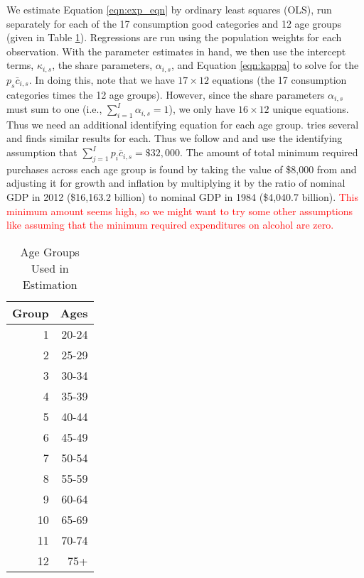 \documentclass[article,11pt,letterpaper,fleqn]{article}
\theoremstyle{definition}
\numberwithin{equation}{section}
\newcommand{\cn}{\citeasnoun} %
\begin{document}
\noindent\noindent  We estimate Equation \ref{eqn:exp_eqn} by ordinary least squares (OLS), run separately for each of the 17 consumption good categories and 12 age groups (given in Table \ref{tab:ages}).  Regressions are run using the population weights for each observation.  With the parameter estimates in hand, we then use the intercept terms, $\kappa_{i,s}$, the share parameters, $\alpha_{i,s}$, and Equation \ref{eqn:kappa} to solve for the $p_{s}\bar{c}_{i,s}$.  In doing this, note that we have $17\times 12$ equations (the 17 consumption categories times the 12 age groups).  However, since the share parameters $\alpha_{i,s}$ must sum to one (i.e., $\sum_{i=1}^{I}\alpha_{i,s}=1$), we only have $16\times 12$ unique equations.  Thus we need an additional identifying equation for each age group.  \cn{King1979} tries several and finds similar results for each. Thus we follow \cn{King1979} and \cn{FR1993} and  use the identifying assumption that $\sum_{j=1}^{I}p_{i}\bar{c}_{i,s}=\$32,000$.  The amount of total minimum required purchases across each age group is found by taking the value of \$8,000 from \cn{FR1993} and adjusting it for growth and inflation by multiplying it by the ratio of nominal GDP in 2012 (\$16,163.2 billion) to nominal GDP in 1984 (\$4,040.7 billion). \textcolor{red}{This minimum amount seems high, so we might want to try some other assumptions like assuming that the minimum required expenditures on alcohol are zero.}

\begin{table}[h!]
  \centering
  \caption{Age Groups Used in Estimation}
    \begin{tabular}{rr}
    \hline
    \hline
    Group & Ages \\
    \hline
    1     & 20-24 \\
    2     & 25-29 \\
    3     & 30-34 \\
    4     & 35-39 \\
    5     & 40-44 \\
    6     & 45-49 \\
    7     & 50-54 \\
    8     & 55-59 \\
    9     & 60-64 \\
    10    & 65-69 \\
    11    & 70-74 \\
    12    & 75+ \\
    \hline
    \hline
    \end{tabular}%
  \label{tab:ages}%
\end{table}%
\end{document}
